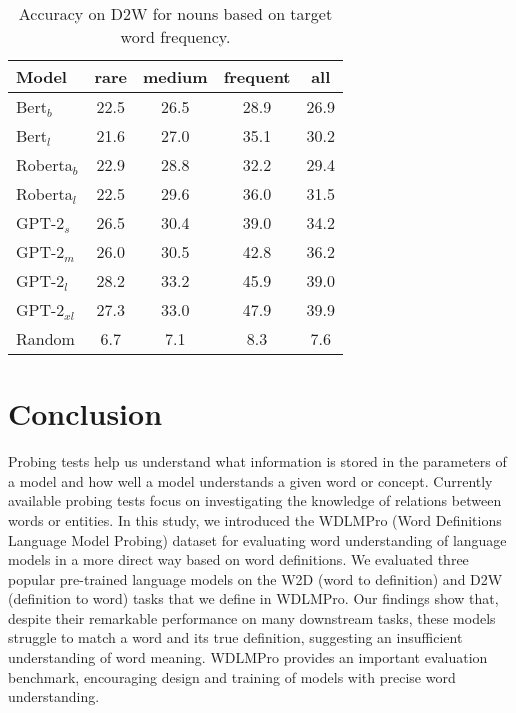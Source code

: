 \documentclass[11pt,a4paper]{article}
\begin{document}
\begin{table}
    \centering
    \begin{tabular}{l|cccc}
    \hline
        \textbf{Model} & \textbf{rare} & \textbf{medium} & \textbf{frequent} & \textbf{all}\\ \hline
     Bert$_{b}$ & 22.5 & 26.5 & 28.9 & 26.9 \\
     Bert$_{l}$ & 21.6 & 27.0 & 35.1 & 30.2 \\
     Roberta$_{b}$ & 22.9 & 28.8 & 32.2 & 29.4 \\
     Roberta$_{l}$ & 22.5 & 29.6 & 36.0 & 31.5 \\ \hline
     GPT-2$_{s}$ & 26.5 & 30.4 & 39.0 & 34.2 \\
     GPT-2$_{m}$ & 26.0 & 30.5 & 42.8 & 36.2 \\
     GPT-2$_{l}$ & 28.2 & 33.2 & 45.9 & 39.0 \\
     GPT-2$_{xl}$ & 27.3 & 33.0 & 47.9 & 39.9 \\ \hline
     Random & 6.7 & 7.1 & 8.3 & 7.6 \\ \hline 
     
    \end{tabular}
    \caption{Accuracy on D2W for  nouns based on target word frequency.}
    \label{tab:freq_results_find_the_word}
\end{table}


\section{Conclusion}

Probing tests help us understand what information
is stored in the parameters of a model and how well a model
understands a given word or concept. Currently available
probing tests focus on investigating the 
knowledge of relations between words or entities. In this study, we
introduced the WDLMPro (Word Definitions Language Model Probing)
dataset for evaluating word understanding of language models
in a more direct way based on word definitions. We evaluated
three popular pre-trained language models on
the W2D (word to definition) and D2W (definition to word)
tasks that we define in
WDLMPro. Our findings show that, despite their remarkable
performance on many downstream tasks, these models struggle
to match a word and its true definition, suggesting an
insufficient understanding of word meaning. WDLMPro provides an
important evaluation benchmark, encouraging design and
training of models with precise word understanding.



\end{document}
